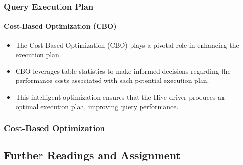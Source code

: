 	\begin{frame}
	\frametitle{Query Execution Plan}
	\framesubtitle{Cost-Based Optimization (CBO)}
	
	\begin{itemize}
	  \item The Cost-Based Optimization (CBO) plays a pivotal role in enhancing the execution plan.
	  \item CBO leverages table statistics to make informed decisions regarding the performance costs associated with each potential execution plan.
	  \item This intelligent optimization ensures that the Hive driver produces an optimal execution plan, improving query performance.
	\end{itemize}
	
	\end{frame}
\subsubsection{Cost-Based Optimization}
\subsection{Further Readings and Assignment}


